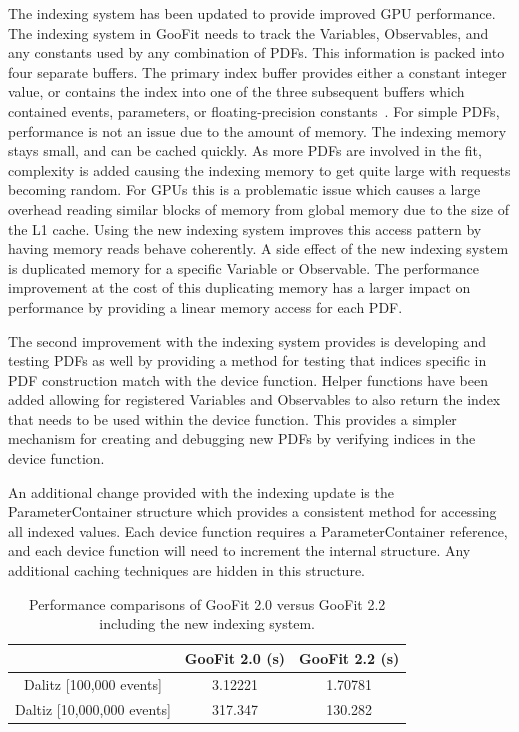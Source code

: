 \documentclass{webofc}
\begin{document}
The indexing system has been updated to provide improved GPU performance. The indexing system in GooFit needs to track the Variables, Observables, and any constants used by any combination of PDFs. This information is packed into four separate buffers. The primary index buffer provides either a constant integer value, or contains the index into one of the three subsequent buffers which contained events, parameters, or floating-precision constants~\cite{lib:GooFit:main}. For simple PDFs, performance is not an issue due to the amount of memory. The indexing memory stays small, and can be cached quickly. As more PDFs are involved in the fit, complexity is added causing the indexing memory to get quite large with requests becoming random. For GPUs this is a problematic issue which causes a large overhead reading similar blocks of memory from global memory due to the size of the L1 cache. Using the new indexing system improves this access pattern by having memory reads behave coherently. A side effect of the new indexing system is duplicated memory for a specific Variable or Observable. The performance improvement at the cost of this duplicating memory has a larger impact on performance by providing a linear memory access for each PDF.

The second improvement with the indexing system provides is developing and testing PDFs as well by providing a method for testing that indices specific in PDF construction match with the device function. Helper functions have been added allowing for registered Variables and Observables to also return the index that needs to be used within the device function. This provides a simpler mechanism for creating and debugging new PDFs by verifying indices in the device function. 

An additional change provided with the indexing update is the ParameterContainer structure which provides a consistent method for accessing all indexed values. Each device function requires a ParameterContainer reference, and each device function will need to increment the internal structure. Any additional caching techniques are hidden in this structure.

\begin{table}
	\centering
	\begin{tabular}{c|c|c}
			 & GooFit 2.0 (s) & GooFit 2.2 (s) \\
		\hline
			Dalitz [100,000 events] & 3.12221 & 1.70781 \\
			Daltiz [10,000,000 events] & 317.347 & 130.282 \\
	\end{tabular}
	\caption{Performance comparisons of GooFit 2.0 versus GooFit 2.2 including the new indexing system.}
	\label{table:1}
\end{table}
\end{document}
